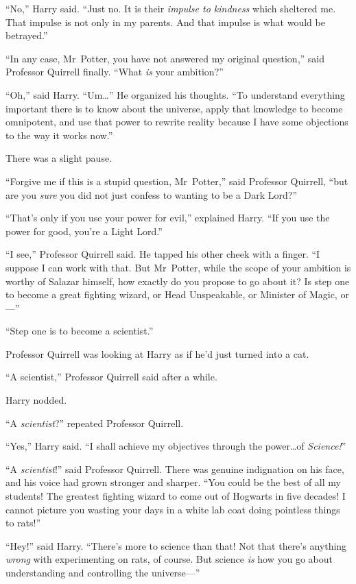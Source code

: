 “No,” Harry said.
“Just no. It is their \emph{impulse to kindness} which sheltered me. That impulse is not only in my parents. And that impulse is what would be betrayed.”

“In any case, Mr~Potter, you have not answered my original question,” said Professor Quirrell finally.
“What \emph{is} your ambition?”

“Oh,” said Harry.
“Um…” He organized his thoughts.
“To understand everything important there is to know about the universe, apply that knowledge to become omnipotent, and use that power to rewrite reality because I have some objections to the way it works now.”

There was a slight pause.

“Forgive me if this is a stupid question, Mr~Potter,” said Professor Quirrell, “but are you \emph{sure} you did not just confess to wanting to be a Dark Lord?”

“That’s only if you use your power for evil,” explained Harry.
“If you use the power for good, you’re a Light Lord.”

“I see,” Professor Quirrell said. He tapped his other cheek with a finger.
“I suppose I can work with that. But Mr~Potter, while the scope of your ambition is worthy of Salazar himself, how exactly do you propose to go about it? Is step one to become a great fighting wizard, or Head Unspeakable, or Minister of Magic, or—”

“Step one is to become a scientist.”

Professor Quirrell was looking at Harry as if he’d just turned into a cat.

“A scientist,” Professor Quirrell said after a while.

Harry nodded.

“A \emph{scientist}?” repeated Professor Quirrell.

“Yes,” Harry said.
“I shall achieve my objectives through the power…of \emph{Science!}”

“A \emph{scientist}!” said Professor Quirrell. There was genuine indignation on his face, and his voice had grown stronger and sharper.
“You could be the best of all my students! The greatest fighting wizard to come out of Hogwarts in five decades! I cannot picture you wasting your days in a white lab coat doing pointless things to rats!”

“Hey!” said Harry.
“There’s more to science than that! Not that there’s anything \emph{wrong} with experimenting on rats, of course. But science \emph{is} how you go about understanding and controlling the universe—”

